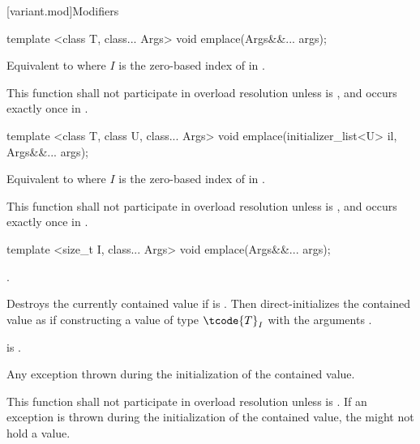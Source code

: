 [variant.mod]{Modifiers}

%
\begin{itemdecl}
template <class T, class... Args> void emplace(Args&&... args);
\end{itemdecl}

\begin{itemdescr}
\pnum
\effects
Equivalent to  where $I$
is the zero-based index of  in .

\pnum
\remarks
This function shall not participate in overload resolution unless
 is , and  occurs
exactly once in .
\end{itemdescr}

%
\begin{itemdecl}
template <class T, class U, class... Args> void emplace(initializer_list<U> il, Args&&... args);
\end{itemdecl}

\begin{itemdescr}
\pnum
\effects
Equivalent to  where
$I$ is the zero-based index of  in .

\pnum
\remarks
This function shall not participate in overload resolution unless
 is ,
and  occurs exactly once in .
\end{itemdescr}

%
\begin{itemdecl}
template <size_t I, class... Args> void emplace(Args&&... args);
\end{itemdecl}

\begin{itemdescr}
\pnum
\requires
{}.

\pnum
\effects
Destroys the currently contained value if 
is . Then direct-initializes the contained value as if
constructing a value of type $\tcode{T}_I$ with the arguments
.

\pnum
\postconditions
{} is .

\pnum
\throws
Any exception thrown during the initialization of the contained value.

\pnum
\remarks
This function shall not participate in overload resolution unless
 is .
If an exception is thrown during the initialization of the contained value,
the  might not hold a value.
\end{itemdescr}

